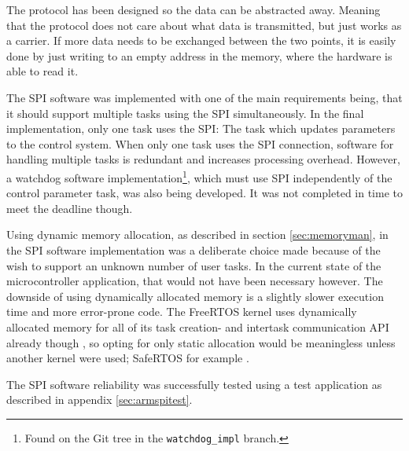 The protocol has been designed so the data can be abstracted away. Meaning that the protocol does not care about what data is transmitted, but just works as a carrier. If more data needs to be exchanged between the two points, it is easily done by just writing to an empty address in the memory, where the hardware is able to read it.

The SPI software was implemented with one of the main requirements being, that it should support multiple tasks using the SPI simultaneously. In the final implementation, only one task uses the SPI: The task which updates parameters to the control system. When only one task uses the SPI connection, software for handling multiple tasks is redundant and increases processing overhead. However, a watchdog software implementation\footnote{Found on the Git tree in the \texttt{watchdog\_impl} branch.}, which must use SPI independently of the control parameter task, was also being developed. It was not completed in time to meet the deadline though.

Using dynamic memory allocation, as described in section \ref{sec:memoryman}, in the SPI software implementation was a deliberate choice made because of the wish to support an unknown number of user tasks. In the current state of the microcontroller application, that would not have been necessary however. The downside of using dynamically allocated memory is a slightly slower execution time and more error-prone code. The FreeRTOS kernel uses dynamically allocated memory for all of its task creation- and intertask communication API already though \cite{website:freertos-memory}, so opting for only static allocation would be meaningless unless another kernel were used; SafeRTOS for example \cite[13]{safertos}.

The SPI software reliability was successfully tested using a test application as described in appendix \ref{sec:armspitest}.

%
%
%
%

